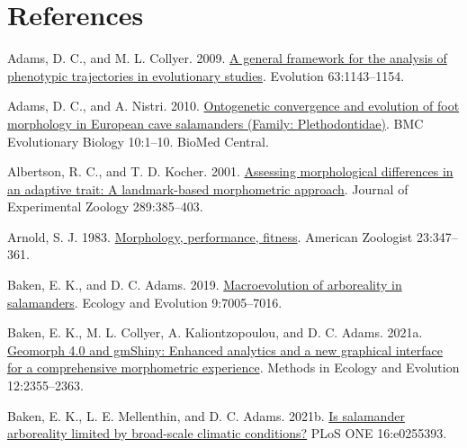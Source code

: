 \documentclass[
  11pt,
]{article}
\newlength{\cslhangindent}
\newlength{\cslentryspacingunit} %
\newenvironment{CSLReferences}[2] %
 {%
  \setlength{\parindent}{0pt}
  \ifodd #1
  \let\oldpar\par
  \def\par{\hangindent=\cslhangindent\oldpar}
  \fi
  \setlength{\parskip}{#2\cslentryspacingunit}
 }%
 {}
\begin{document}
\hypertarget{references}{%
\section*{References}\label{references}}

\setlength{\parindent}{-0.25in} \setlength{\leftskip}{0.25in}
\setlength{\parskip}{8pt} \noindent

\hypertarget{refs}{}
\begin{CSLReferences}{1}{0}
\leavevmode{}%
Adams, D. C., and M. L. Collyer. 2009.
\href{https://doi.org/10.1111/j.1558-5646.2009.00649.x}{A general
framework for the analysis of phenotypic trajectories in evolutionary
studies}. Evolution 63:1143--1154.

\leavevmode{}%
Adams, D. C., and A. Nistri. 2010.
\href{https://doi.org/10.1186/1471-2148-10-216}{Ontogenetic convergence
and evolution of foot morphology in {E}uropean cave salamanders
({F}amily: {P}lethodontidae)}. BMC Evolutionary Biology 10:1--10. BioMed
Central.

\leavevmode{}%
Albertson, R. C., and T. D. Kocher. 2001.
\href{https://doi.org/10.1002/jez.1020}{Assessing morphological
differences in an adaptive trait: A landmark-based morphometric
approach}. Journal of Experimental Zoology 289:385--403.

\leavevmode{}%
Arnold, S. J. 1983.
\href{https://doi.org/10.1093/icb/23.2.347}{Morphology, performance,
fitness}. American Zoologist 23:347--361.

\leavevmode{}%
Baken, E. K., and D. C. Adams. 2019.
\href{https://doi.org/10.1002/ece3.5267}{Macroevolution of arboreality
in salamanders}. Ecology and Evolution 9:7005--7016.

\leavevmode{}%
Baken, E. K., M. L. Collyer, A. Kaliontzopoulou, and D. C. Adams. 2021a.
\href{https://doi.org/10.1111/2041-210X.13723}{Geomorph 4.0 and gmShiny:
Enhanced analytics and a new graphical interface for a comprehensive
morphometric experience}. Methods in Ecology and Evolution
12:2355--2363.

\leavevmode{}%
Baken, E. K., L. E. Mellenthin, and D. C. Adams. 2021b.
\href{https://doi.org/10.1371/journal.pone.0255393}{Is salamander
arboreality limited by broad-scale climatic conditions?} PLoS ONE
16:e0255393.


\end{CSLReferences}
\end{document}
